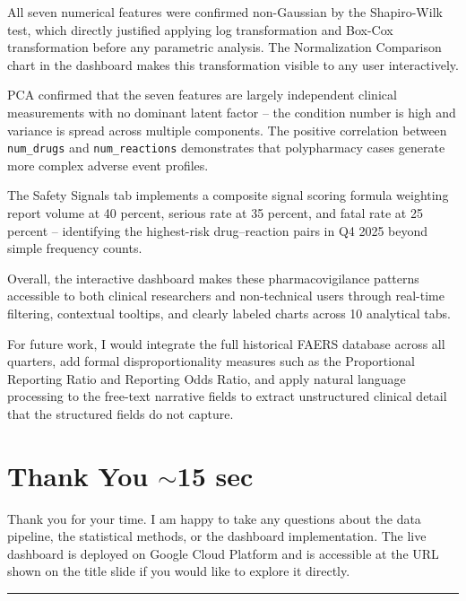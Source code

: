 \documentclass[12pt, letterpaper]{article}
\begin{document}
All seven numerical features were confirmed non-Gaussian by the Shapiro-Wilk
test, which directly justified applying log transformation and Box-Cox
transformation before any parametric analysis. The Normalization Comparison
chart in the dashboard makes this transformation visible to any user
interactively.

PCA confirmed that the seven features are largely independent clinical
measurements with no dominant latent factor -- the condition number is high and
variance is spread across multiple components. The positive correlation between
\texttt{num\_drugs} and \texttt{num\_reactions} demonstrates that polypharmacy
cases generate more complex adverse event profiles.

The Safety Signals tab implements a composite signal scoring formula weighting
report volume at 40 percent, serious rate at 35 percent, and fatal rate at 25
percent -- identifying the highest-risk drug--reaction pairs in Q4 2025 beyond
simple frequency counts.

Overall, the interactive dashboard makes these pharmacovigilance patterns
accessible to both clinical researchers and non-technical users through
real-time filtering, contextual tooltips, and clearly labeled charts across
10 analytical tabs.

For future work, I would integrate the full historical FAERS database across all
quarters, add formal disproportionality measures such as the Proportional
Reporting Ratio and Reporting Odds Ratio, and apply natural language processing
to the free-text narrative fields to extract unstructured clinical detail that
the structured fields do not capture.

\section{Thank You \hfill \textcolor{slidenumber}{\small $\sim$15 sec}}

Thank you for your time. I am happy to take any questions about the data
pipeline, the statistical methods, or the dashboard implementation. The live
dashboard is deployed on Google Cloud Platform and is accessible at the URL
shown on the title slide if you would like to explore it directly.

\vspace{20pt}
\textcolor{accent}{\rule{\linewidth}{1pt}}
\vspace{8pt}
\end{document}

